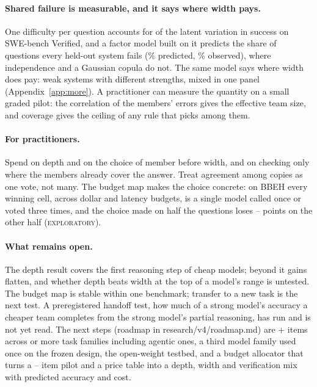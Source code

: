 \documentclass{article}
\newcommand{\status}[1]{{\upshape\textsc{\small #1}}}
\begin{document}
\paragraph{Shared failure is measurable, and it says where width pays.} One difficulty per question accounts for
 of the latent variation in success on SWE-bench Verified, and a factor model built on it predicts the
share of questions every held-out system fails (\% predicted, \% observed), where
independence and a Gaussian copula do not. The same model says where width does pay: weak systems with different
strengths, mixed in one panel (Appendix~\ref{app:more}). A practitioner can measure the quantity on a small graded
pilot: the correlation of the members' errors gives the effective team size, and coverage gives the ceiling of any rule
that picks among them.

\paragraph{For practitioners.} Spend on depth and on the choice of member before width, and on checking only where
the members already cover the answer. Treat agreement among copies as one vote, not many. The budget map makes the
choice concrete: on BBEH every winning cell, across dollar and latency budgets, is a single model called once or voted
three times, and the choice made on half the questions loses -- points on the other
half (\status{exploratory}).

\paragraph{What remains open.} The depth result covers the first reasoning step of cheap models; beyond it gains
flatten, and whether depth beats width at the top of a model's range is untested. The budget map is stable within one
benchmark; transfer to a new task is the next test. A preregistered handoff test, how much of a strong model's accuracy
a cheaper team completes from the strong model's partial reasoning, has run and is not yet read. The next steps
(roadmap in research/v4/roadmap.md) are + items across  or more task families including
agentic ones, a third model family used once on the frozen design, the open-weight testbed, and a budget allocator that
turns a -- item pilot and a price table into a depth, width and verification mix
with predicted accuracy and cost.
\end{document}
